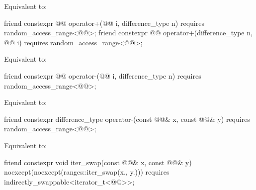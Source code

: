 \begin{itemdescr}
\pnum
\effects
Equivalent to: 
\end{itemdescr}

%
\begin{itemdecl}
friend constexpr @@ operator+(@@ i, difference_type n)
  requires random_access_range<@@>;
friend constexpr @@ operator+(difference_type n, @@ i)
  requires random_access_range<@@>;
\end{itemdecl}

\begin{itemdescr}
\pnum
\effects
Equivalent to: 
\end{itemdescr}

%
\begin{itemdecl}
friend constexpr @@ operator-(@@ i, difference_type n)
  requires random_access_range<@@>;
\end{itemdecl}

\begin{itemdescr}
\pnum
\effects
Equivalent to: 
\end{itemdescr}

%
\begin{itemdecl}
friend constexpr difference_type operator-(const @@& x, const @@& y)
  requires random_access_range<@@>;
\end{itemdecl}

\begin{itemdescr}
\pnum
\effects
Equivalent to: 
\end{itemdescr}

%
\begin{itemdecl}
friend constexpr void iter_swap(const @@& x, const @@& y)
  noexcept(noexcept(ranges::iter_swap(x., y.)))
  requires indirectly_swappable<iterator_t<@@>>;
\end{itemdecl}

